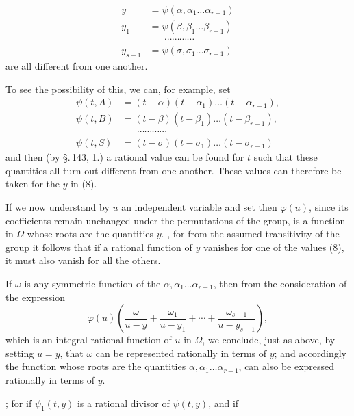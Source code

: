 \[
\begin{aligned}
y &= \psi(\alpha, \alpha_1 \ldots \alpha_{r-1}) \\
y_1 &= \psi(\beta, \beta_1 \ldots \beta_{r-1}) \\
& \phantom{=} \; \cdots\cdots\cdots\cdots \\
y_{s-1} &= \psi(\sigma, \sigma_1 \ldots \sigma_{r-1})
\end{aligned}
\tag{8}
\]
are all different from one another.

To see the possibility of this, we can, for example, set
\[
\begin{aligned}
\psi(t, A) &= (t - \alpha)(t - \alpha_1) \ldots (t - \alpha_{r-1}), \\
\psi(t, B) &= (t - \beta)(t - \beta_1) \ldots (t - \beta_{r-1}), \\
& \phantom{=} \; \cdots\cdots\cdots\cdots \\
\psi(t, S) &= (t - \sigma)(t - \sigma_1) \ldots (t - \sigma_{r-1})
\end{aligned}
\tag{9}
\]
and then (by \S.\,143, 1.) a rational value can be found for $t$ such
that these quantities all turn out different from one another. These
values can therefore be taken for the $y$ in (8).

If we now understand by $u$ an independent variable and set
then $\varphi(u)$, since its coefficients remain unchanged under the permutations
of the group, is a function in $\Omega$ whose roots are the quantities $y$. , for
from the assumed transitivity of the group it follows that
if a rational function of $y$ vanishes for one of the values (8),
it must also vanish for all the others.

If $\omega$ is any symmetric function of the $\alpha, \alpha_1 \ldots \alpha_{r-1}$,
then from the consideration of the expression
\[
\varphi(u) \left( \frac{\omega}{u - y} + \frac{\omega_1}{u - y_1} + \cdots + \frac{\omega_{s-1}}{u - y_{s-1}} \right),
\]
which is an integral rational function of $u$ in $\Omega$, we conclude, just as above,
by setting $u = y$, that $\omega$ can be represented rationally
in terms of $y$; and accordingly the function
whose roots are the quantities $\alpha, \alpha_1 \ldots \alpha_{r-1}$, can also be expressed
rationally in terms of $y$.

; for if $\psi_1(t, y)$ is a rational divisor
of $\psi(t, y)$, and if
